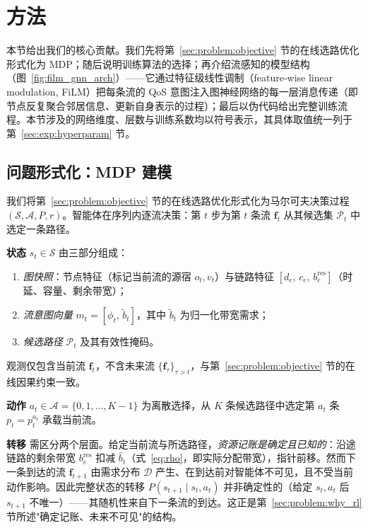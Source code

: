 \section{方法}
\label{sec:method}

本节给出我们的核心贡献。我们先将第~\ref{sec:problem:objective} 节的在线选路优化形式化为 MDP；随后说明训练算法的选择；再介绍流感知的模型结构（图~\ref{fig:film_gnn_arch}）——它通过特征级线性调制（feature-wise linear modulation, FiLM）把每条流的 QoS 意图注入图神经网络的每一层消息传递（即节点反复聚合邻居信息、更新自身表示的过程）；最后以伪代码给出完整训练流程。本节涉及的网络维度、层数与训练系数均以符号表示，其具体取值统一列于第~\ref{sec:exp:hyperparam} 节。

\subsection{问题形式化：MDP 建模}
\label{sec:method:mdp}

我们将第~\ref{sec:problem:objective} 节的在线选路优化形式化为马尔可夫决策过程 $(\mathcal{S},\mathcal{A},P,r)$。智能体在序列内逐流决策：第 $t$ 步为第 $t$ 条流 $\mathbf{f}_t$ 从其候选集 $\mathcal{P}_t$ 中选定一条路径。

\textbf{状态} $s_t\in\mathcal{S}$ 由三部分组成：
\begin{enumerate}
\item \emph{图快照}：节点特征（标记当前流的源宿 $o_t,v_t$）与链路特征 $[d_e,\,c_e,\,b_e^{\text{res}}]$（时延、容量、剩余带宽）；
\item \emph{流意图向量} $m_t=[\phi_t,\,\tilde b_t]$，其中 $\tilde b_t$ 为归一化带宽需求；
\item \emph{候选路径} $\mathcal{P}_t$ 及其有效性掩码。
\end{enumerate}
观测仅包含当前流 $\mathbf{f}_t$，不含未来流 $\{\mathbf{f}_\tau\}_{\tau>t}$，与第~\ref{sec:problem:objective} 节的在线因果约束一致。

\textbf{动作} $a_t\in\mathcal{A}=\{0,1,\dots,K-1\}$ 为离散选择，从 $K$ 条候选路径中选定第 $a_t$ 条 $p_t=p_t^{a_t}$ 承载当前流。

\textbf{转移} 需区分两个层面。给定当前流与所选路径，\emph{资源记账是确定且已知的}：沿途链路的剩余带宽 $b_e^{\text{res}}$ 扣减 $\hat b_t$（式~\eqref{eq:rho}，即实际分配带宽），指针前移。然而下一条到达的流 $\mathbf{f}_{t+1}$ 由需求分布 $\mathcal{D}$ 产生、在到达前对智能体不可见，且不受当前动作影响。因此完整状态的转移 $P(s_{t+1}\mid s_t,a_t)$ 并非确定性的（给定 $s_t,a_t$ 后 $s_{t+1}$ 不唯一）——其随机性来自下一条流的到达。这正是第~\ref{sec:problem:why_rl} 节所述"确定记账、未来不可见"的结构。

